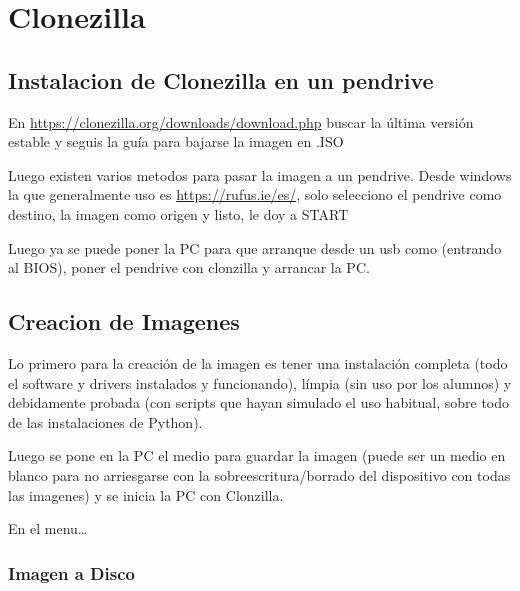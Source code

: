 \chapter{Clonezilla}

\section{Instalacion de Clonezilla en un pendrive}

En \href{Clonezilla Download}{https://clonezilla.org/downloads/download.php} buscar la última versión estable y seguis la guía para bajarse la imagen en .ISO

Luego existen varios metodos para pasar la imagen a un pendrive. Desde windows la que generalmente uso es \href{Rufus}{https://rufus.ie/es/}, solo selecciono el pendrive como destino, la imagen como origen y listo, le doy a START 

Luego ya se puede poner la PC para que arranque desde un usb como (entrando al BIOS), poner el pendrive con clonzilla y arrancar la PC.

\section{Creacion de Imagenes}
Lo primero para la creación de la imagen es tener una instalación completa (todo el software y drivers instalados y funcionando), límpia (sin uso por los alumnos) y debidamente probada (con scripts que hayan simulado el uso habitual, sobre todo de las instalaciones de Python).

Luego se pone en la PC el medio para guardar la imagen (puede ser un medio en blanco para no arriesgarse con la sobreescritura/borrado del dispositivo con todas las imagenes) y se inicia la PC con Clonzilla.

En el menu\dots
{}

\subsection{Imagen a Disco}
